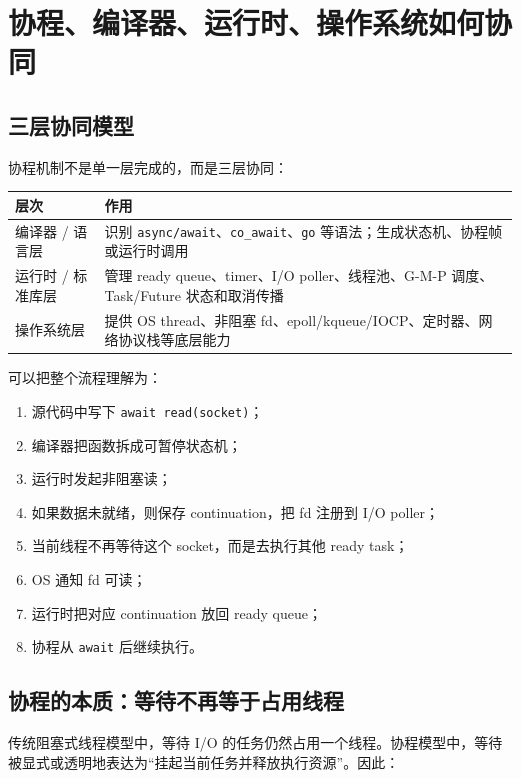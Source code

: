 \documentclass[UTF8,zihao=-4]{ctexart}
\begin{document}
\section{协程、编译器、运行时、操作系统如何协同}

\subsection{三层协同模型}

协程机制不是单一层完成的，而是三层协同：

\begin{center}
\begin{tabular}{p{3cm}p{10cm}}
\toprule
层次 & 作用 \\
\midrule
编译器 / 语言层 & 识别 \texttt{async/await}、\texttt{co\_await}、\texttt{go} 等语法；生成状态机、协程帧或运行时调用 \\
运行时 / 标准库层 & 管理 ready queue、timer、I/O poller、线程池、G-M-P 调度、Task/Future 状态和取消传播 \\
操作系统层 & 提供 OS thread、非阻塞 fd、epoll/kqueue/IOCP、定时器、网络协议栈等底层能力 \\
\bottomrule
\end{tabular}
\end{center}

可以把整个流程理解为：

\begin{enumerate}
  \item 源代码中写下 \texttt{await read(socket)}；
  \item 编译器把函数拆成可暂停状态机；
  \item 运行时发起非阻塞读；
  \item 如果数据未就绪，则保存 continuation，把 fd 注册到 I/O poller；
  \item 当前线程不再等待这个 socket，而是去执行其他 ready task；
  \item OS 通知 fd 可读；
  \item 运行时把对应 continuation 放回 ready queue；
  \item 协程从 \texttt{await} 后继续执行。
\end{enumerate}

\subsection{协程的本质：等待不再等于占用线程}

传统阻塞式线程模型中，等待 I/O 的任务仍然占用一个线程。协程模型中，等待被显式或透明地表达为“挂起当前任务并释放执行资源”。因此：
\end{document}
